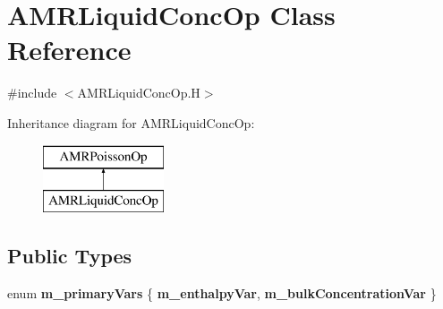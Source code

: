 \hypertarget{class_a_m_r_liquid_conc_op}{\section{A\-M\-R\-Liquid\-Conc\-Op Class Reference}
\label{class_a_m_r_liquid_conc_op}
}


{\ttfamily \#include $<$A\-M\-R\-Liquid\-Conc\-Op.\-H$>$}

Inheritance diagram for A\-M\-R\-Liquid\-Conc\-Op\-:\begin{figure}[H]
\begin{center}
\leavevmode
\includegraphics[height=2.000000cm]{class_a_m_r_liquid_conc_op}
\end{center}
\end{figure}
\subsection*{Public Types}
\begin{DoxyCompactItemize}
\item 
enum {\bfseries m\-\_\-primary\-Vars} \{ {\bfseries m\-\_\-enthalpy\-Var}, 
{\bfseries m\-\_\-bulk\-Concentration\-Var}
 \}
\end{DoxyCompactItemize}
